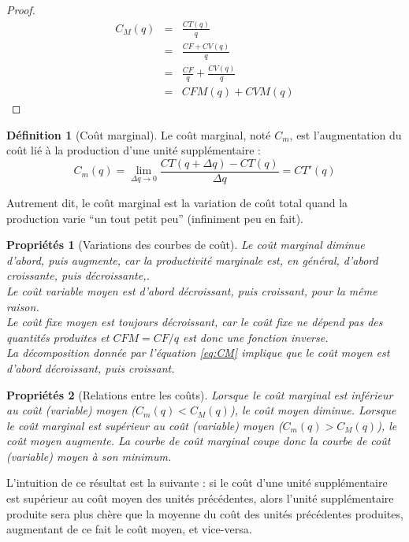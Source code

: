 \documentclass[
  a4paper,
]{book}
\newtheorem{proposition}{Propriétés}[chapter]
\theoremstyle{definition}
\newtheorem{definition}{Définition}[chapter]
\theoremstyle{definition}
\theoremstyle{definition}
\theoremstyle{definition}
\theoremstyle{remark}
\begin{document}
\begin{proof}
\[
\begin{array}{rcl}
C_M(q) &=& \frac{CT(q)}{q}\\
 &=& \frac{CF + CV(q)}{q}\\
 &=& \frac{CF}{q}+\frac{CV(q)}{q}\\
 &=& CFM(q) + CVM(q)
\end{array}
\]
\end{proof}

\begin{definition}[Coût marginal]
Le coût marginal, noté \(C_m\), est l'augmentation du coût lié à la production d'une unité supplémentaire :
\[C_m(q)=\lim_{\Delta q\to 0}\frac{CT(q+\Delta q)-CT(q)}{\Delta q}=CT'(q)\]
\end{definition}

Autrement dit, le coût marginal est la variation de coût total quand la production varie ``un tout petit peu'' (infiniment peu en fait).

\begin{proposition}[Variations des courbes de coût]
Le coût marginal diminue d'abord, puis augmente, car la productivité marginale est, en général, d'abord croissante, puis décroissante,.\\
Le coût variable moyen est d'abord décroissant, puis croissant, pour la même raison.\\
Le coût fixe moyen est toujours décroissant, car le coût fixe ne dépend pas des quantités produites et \(CFM=CF/q\) est donc une fonction inverse.\\
La décomposition donnée par l'équation \eqref{eq:CM} implique que le coût moyen est d'abord décroissant, puis croissant.
\end{proposition}

\begin{proposition}[Relations entre les coûts]
Lorsque le coût marginal est inférieur au coût (variable) moyen (\(C_m(q)<C_M(q)\)), le coût moyen diminue.
Lorsque le coût marginal est supérieur au coût (variable) moyen (\(C_m(q)>C_M(q)\)), le coût moyen augmente.
La courbe de coût marginal coupe donc la courbe de coût (variable) moyen à son minimum.
\end{proposition}

L'intuition de ce résultat est la suivante : si le coût d'une unité supplémentaire est supérieur au coût moyen des unités précédentes, alors l'unité supplémentaire produite sera plus chère que la moyenne du coût des unités précédentes produites, augmentant de ce fait le coût moyen, et vice-versa.
\end{document}
